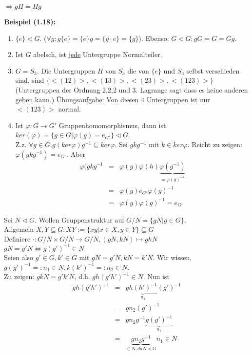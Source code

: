 \documentclass[10pt,a4paper]{article}
\begin{document}
$\Rightarrow gH = Hg$ %

\textbf{Beispiel (1.18):}\begin{enumerate}
\item $\{ e \} \triangleleft G$. ($ \forall g: g \{ e \} = \{ e \} g = \{ g \cdot e \} = \{ g \}$). Ebenso: $G \triangleleft G: gG = G = Gg$.
\item Ist $G$ abelsch, ist \underline{jede} Untergruppe Normalteiler. 
\item $G = S_3$. Die Untergruppen $H$ von $S_3$ die von $\{e\}$ und $S_3$ selbst verschieden sind, sind $\{<(12)>, <(13)>, <(23)>, <(123)>\}$ (Untergruppen der Ordnung 2,2,2 und 3. Lagrange sagt dass es keine anderen geben kann.)
Übungsaufgabe: Von diesen 4 Untergruppen ist nur $<(123)>$ normal.
\item Ist $\varphi : G \rightarrow G'$ Gruppenhomomorphismus, dann ist $ker(\varphi) = \lbrace g \in G | \varphi(g) = e_{G'} \rbrace \lhd G$.\\
      Z.z. $\forall g \in G . g(ker \varphi) g^{-1} \subseteq ker \varphi$. Sei $g k g^{-1}$ mit $k \in ker \varphi$. Reicht zu zeigen: $\varphi(gkg^{-1}) = e_{G'}$. Aber 
      \begin{eqnarray*}
\varphi(gkg^{-1} & = & \varphi(g) \varphi(h) \underbrace{\varphi(g^{-1})}_{= \varphi(g)^{-1}}\\
              & = & \varphi(g) e_{G'} \varphi(g)^{-1}\\
              & = & \varphi(g) \varphi(g)^{-1} = e_{G'}       
      \end{eqnarray*}
\end{enumerate}

Sei $N \lhd G$. Wollen Gruppenstruktur auf $G/N = \lbrace gN | g \in G\rbrace$.\\
Allgemein $X,Y \subseteq G : XY := \lbrace xy | x \in X, y \in Y \rbrace \subseteq G$\\
Definiere $\cdot : G/N \times G/N \rightarrow G/N, (gN, kN) \mapsto ghN$\\
$gN = g'N \Leftrightarrow g(g')^{-1} \in N$\\

Seien also $g' \in G, k' \in G$ mit $gN = g'N, kN = k'N$. Wir wissen, $g(g')^{-1} =: n_1 \in N, k(k')^{-1} =: n_2 \in N$.\\
Zu zeigen: $gkN = g'k'N$, d.h. $gh(g'h')^{-1} \in N$. Nun ist 
\begin{eqnarray*}
gh(g'h')^{-1} &=& g \underbrace{h(h')^{-1}}_{n_2}(g')^{-1}\\
&=& g n_2 (g')^{-1}\\
&=& g n_2 g^{-1} \underbrace{g (g')^{-1}}_{n_1}\\
&=& \underbrace{g n_2 g^{-1}}_{\in N, da N \lhd G} n_1 \in N 
\end{eqnarray*}
\end{document}
